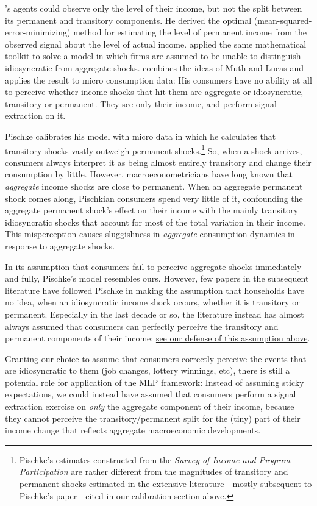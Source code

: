 \documentclass[titlepage]{article}
\begin{document}
\cite{muthOptimal}'s agents could observe only the level of their income, but not the split between its permanent and transitory components.  He derived the optimal (mean-squared-error-minimizing) method for estimating the level of permanent income from the observed signal about the level of actual income.  \cite{lucas:imperfectInfo} applied the same mathematical toolkit to solve a model in which firms are assumed to be unable to distinguish idiosyncratic from aggregate shocks.  \cite{pischkeMicroMacro} combines the ideas of Muth and Lucas and applies the result to micro consumption data: His consumers have no ability at all to perceive whether income shocks that hit them are aggregate or idiosyncratic, transitory or permanent.  They see only their income, and perform signal extraction on it.

Pischke calibrates his model with micro data in which he calculates that transitory shocks vastly outweigh permanent shocks.\footnote{Pischke's estimates constructed from the {\it Survey of Income and Program Participation} are rather different from the magnitudes of transitory and permanent shocks estimated in the extensive literature---mostly subsequent to Pischke's paper---cited in our calibration section above.}  So, when a shock arrives, consumers always interpret it as being almost entirely transitory and change their consumption by little.  However, macroeconometricians have long known that {\it aggregate} income shocks are close to permanent.  When an aggregate permanent shock comes along, Pischkian consumers spend very little of it, confounding the aggregate permanent shock's effect on their income with the mainly transitory idiosyncratic shocks that account for most of the total variation in their income.  This misperception causes sluggishness in {\it aggregate} consumption dynamics in response to aggregate shocks.

In its assumption that consumers fail to perceive aggregate shocks immediately and fully, Pischke's model resembles ours.  However, few papers in the subsequent literature have followed Pischke in making the assumption that households have no idea, when an idiosyncratic income shock occurs, whether it is transitory or permanent.  Especially in the last decade or so, the literature instead has almost always assumed that consumers can perfectly perceive the transitory and permanent components of their income; \hyperlink{Why-Consumers-See-Individual-Shocks}{see our defense of this assumption above}.

Granting our choice to assume that consumers correctly perceive the events that are idiosyncratic to them (job changes, lottery winnings, etc), there is still a potential role for application of the MLP framework:  Instead of assuming sticky expectations, we could instead have assumed that consumers perform a signal extraction exercise on \textit{only} the aggregate component of their income, because they cannot perceive the transitory/permanent split for the (tiny) part of their income change that reflects aggregate macroeconomic developments.
\end{document}
